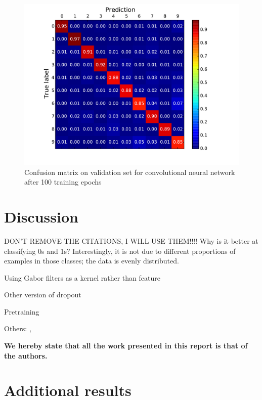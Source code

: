 \documentclass{acm_proc_article-sp}
\begin{document}
\begin{figure}[h!]
	\centering
	\includegraphics[width=\linewidth]{convnet_confusion.pdf}
  	\caption{Confusion matrix on validation set for convolutional neural network after 100 training epochs}
  	\label{fig:convnet-confusion}
\end{figure}


\section{Discussion}%
DON'T REMOVE THE CITATIONS, I WILL USE THEM!!!!
Why is it better at classifying 0s and 1s? Interestingly, it is not due to different proportions of examples in those classes; the data is evenly distributed.

Using Gabor filters as a kernel rather than feature \cite{Sabri}

Other version of dropout \cite{Wan}

Pretraining \cite{Erhan}

Others: \cite{Rowley}, \cite{Simard}

{\bfseries We hereby state that all the work presented in this report is that of the authors.}




\newpage
\appendix
\label{appendix}

\section{Additional results}
\label{sec:additional-results}
\end{document}
